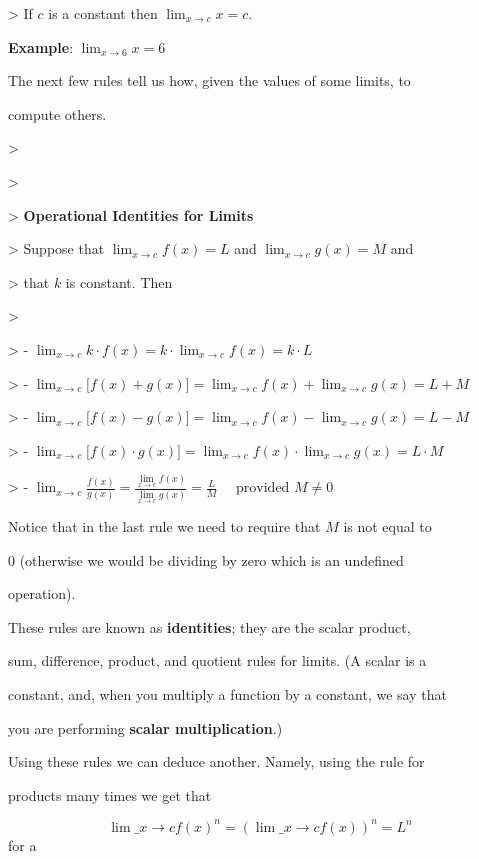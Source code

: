 >    If $c$ is a constant then $\lim_{x\to c}x=c$.



   \textbf{Example}: $\lim_{x\to6}x=6$



The next few rules tell us how, given the values of some limits, to

compute others.



> 

>

>    \textbf{Operational Identities for Limits}

>    Suppose that $\lim_{x\to c}f(x)=L$ and $\lim_{x\to c}g(x)=M$ and

>     that $k$ is constant. Then

>

> -   $\lim_{x\to c}k\cdot f(x)=k\cdot\lim_{x\to c}f(x)=k\cdot L$

> -   $\lim_{x\to c}\Big[f(x)+g(x)\Big]=\lim_{x\to c}f(x)+\lim_{x\to c}g(x)=L+M$

> -   $\lim_{x\to c}\Big[f(x)-g(x)\Big]=\lim_{x\to c}f(x)-\lim_{x\to c}g(x)=L-M$

> -   $\lim_{x\to c}\Big[f(x)\cdot g(x)\Big]=\lim_{x\to c}f(x)\cdot\lim_{x\to c}g(x)=L\cdot M$

> -   $\lim_{x\to c}\frac{f(x)}{g(x)}=\frac{\lim\limits_{x\to c}f(x)}{\lim\limits_{x\to c}g(x)}=\frac{L}{M}\quad\text{ provided }M\ne0$



Notice that in the last rule we need to require that $M$ is not equal to

0 (otherwise we would be dividing by zero which is an undefined

operation).



These rules are known as \textbf{identities}; they are the scalar product,

sum, difference, product, and quotient rules for limits. (A scalar is a

constant, and, when you multiply a function by a constant, we say that

you are performing \textbf{scalar multiplication}.)



Using these rules we can deduce another. Namely, using the rule for

products many times we get that



$$\lim\_{x\to c}f(x)^n=\left(\lim\_{x\to c}f(x)\right)^n=L^n$$ for a

